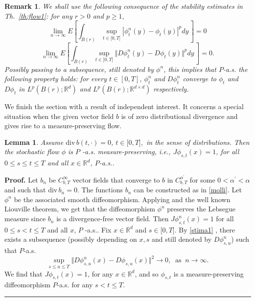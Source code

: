 \documentclass[a4paper,11pt]{article}
\newtheorem{lemma}[theorem]{Lemma}
\newtheorem{remark}[theorem]{Remark}
\newenvironment{proof}[1][Proof]{\textbf{#1.} }{\ \rule{0.5em}{0.5em}}
\begin{document}
\begin{remark}
\label{civuole} We shall use the following consequence of the stability
estimates in Th.~\ref{th:flow1}: for any $r>0$ and $p\geq 1$,
\begin{equation*}
\lim_{n\rightarrow \infty }E\left[ \int_{B\left( r\right) }\sup_{t\in
\lbrack 0,T]}|\phi _{t}^{n}(y)-\phi _{t}(y)|^{p}dy\,\right] =0
\end{equation*}
\begin{equation*}
\lim_{n\rightarrow \infty }E\left[ \int_{B\left( r\right) }\sup_{t\in
\lbrack 0,T]}\Vert D\phi _{t}^{n}(y)-D\phi _{t}(y)\Vert ^{p}dy\,\right] =0.
\end{equation*}
Possibly passing to a subsequence, still denoted by $\phi ^{n}$, this
implies that $P$-a.s. the following property holds: for every $t\in \left[
0,T\right] $, $\phi _{t}^{n}$ and $D\phi _{t}^{n}$ converge to $\phi _{t}$
and $D\phi _{t}$ in $L^{p}\left( B\left( r\right) ;{\mathbb{R}}^{d}\right) $
and $L^{p}\left( B\left( r\right) ;{\mathbb{R}}^{d\times d}\right) $
respectively.
\end{remark}

We finish the section with a result of independent interest. It concerns a
special situation when the given vector field $b$ is of zero distributional
divergence and gives rise to a measure-preserving flow.

\begin{lemma}
\label{lemma change} Assume ${\mathrm{div}\,}b(t,\cdot )=0$, $t\in \lbrack
0,T],$ in the sense of distributions. Then the stochastic flow $\phi $ is $P$%
-a.s. measure-preserving, i.e., $J\phi _{s,t}(x)=1$, for all $0\leq s\leq
t\leq T$ and all $x\in {\mathbb{R}}^{d}$, $P$-a.s..
\end{lemma}

\begin{proof}
Let $b_{n}$ be $C_{b,T}^{\infty }$ vector fields that converge to $b$ in $%
C_{b,T}^{{\alpha ^{\prime }}}$ for some $0<\alpha ^{\prime }<\alpha $ and
such that ${\mathrm{div}\,}b_{n}=0$. The functions $b_{n}$ can be
constructed as in \eqref{molli}. Let $\phi ^{n}$ be the associated smooth
diffeomorphism. Applying \cite[Theorem II.3.1]{K} and the well known
Liouville theorem, we get that the diffeomorphism $\phi ^{n}$ preserves the
Lebsegue measure since $b_{n}$ is a divergence-free vector field.
%
%
%
%
%
%
%
Then $J\phi _{s,t}^{n}(x)=1$ for all $0\leq s<t\leq T$ and all $x$, $P$%
-a.s.. Fix $x\in {\mathbb{R}}^{d}$ and $s\in \lbrack 0,T]$. By \eqref{stima1}%
, there exists a subsequence (possibly depending on $x,s$ and still denoted
by $D\phi _{s,u}^{n}$) such that $P$-a.s.
\begin{equation*}
\sup_{s\leq u\leq T}\Vert D\phi _{s,u}^{n}(x)-D\phi _{s,u}(x)\Vert
^{2}\rightarrow 0,\;\;\mbox{as}\;\;n\rightarrow \infty .
\end{equation*}
We find that $J\phi _{s,t}(x)=1$, for any $x\in {\mathbb{R}}^{d}$, and so $%
\phi _{s,t}$ is a measure-preserving diffeomorphism $P$-a.s. for any $%
s<t\leq T$.
\end{proof}
\end{document}

